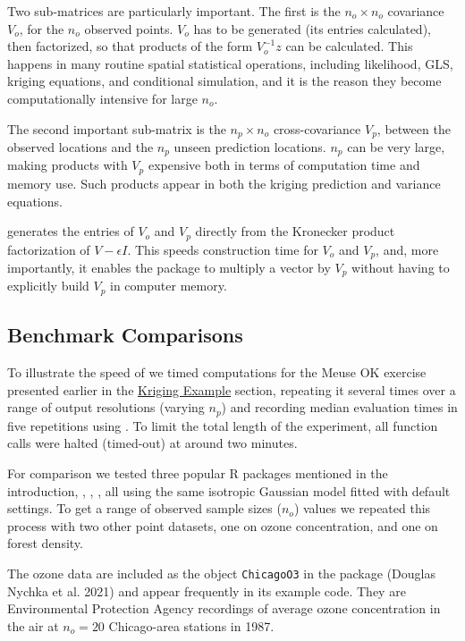 Two sub-matrices are particularly important. The first is the \(n_o \times n_o\) covariance \(V_o\), for the \(n_o\) observed points. \(V_o\) has to be generated (its entries calculated), then factorized, so that products of the form \(V_o^{-1} z\) can be calculated. This happens in many routine spatial statistical operations, including likelihood, GLS, kriging equations, and conditional simulation, and it is the reason they become computationally intensive for large \(n_o\).

The second important sub-matrix is the \(n_p \times n_o\) cross-covariance \(V_p\), between the observed locations and the \(n_p\) unseen prediction locations. \(n_p\) can be very large, making products with \(V_p\) expensive both in terms of computation time and memory use. Such products appear in both the kriging prediction and variance equations.

 generates the entries of \(V_o\) and \(V_p\) directly from the Kronecker product factorization of \(V - \epsilon I\). This speeds construction time for \(V_o\) and \(V_p\), and, more importantly, it enables the package to multiply a vector by \(V_p\) without having to explicitly build \(V_p\) in computer memory.

\hypertarget{benchmark-comparisons}{%
\subsection{Benchmark Comparisons}\label{benchmark-comparisons}}

To illustrate the speed of  we timed computations for the Meuse OK exercise presented earlier in the \protect\hyperlink{kriging-example}{Kriging Example} section, repeating it several times over a range of output resolutions (varying \(n_p\)) and recording median evaluation times in five repetitions using . To limit the total length of the experiment, all function calls were halted (timed-out) at around two minutes.

For comparison we tested three popular R packages mentioned in the introduction, , , , all using the same isotropic Gaussian model fitted with default settings. To get a range of observed sample sizes (\(n_o\)) values we repeated this process with two other point datasets, one on ozone concentration, and one on forest density.

The ozone data are included as the object \texttt{ChicagoO3} in the  package (Douglas Nychka et al. 2021) and appear frequently in its example code. They are Environmental Protection Agency recordings of average ozone concentration in the air at \(n_o=20\) Chicago-area stations in 1987.

